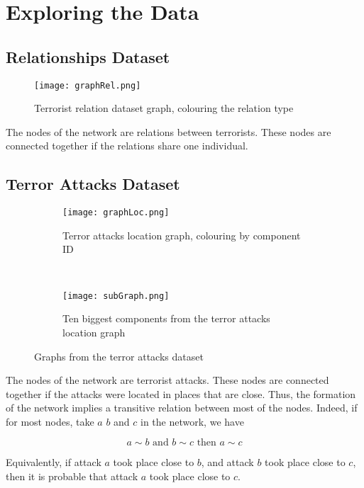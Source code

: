 \section{Exploring the Data}
\label{sec:Exploring the Data}

\subsection{Relationships Dataset}
\label{subsec:Relationships Dataset}

\begin{figure}[H]
\begin{center}

        \texttt{[image: graphRel.png]}
        \label{fig:graphLoc}
        \caption{Terrorist relation dataset graph, colouring the relation type}
        
\end{center}
\end{figure}

The nodes of the network are relations between terrorists. These nodes are connected together if the relations share one individual.

\subsection{Terror Attacks Dataset}
\label{subsec:Terror Attacks Dataset}

\begin{figure}[H]
\begin{center}
    \begin{subfigure}[b]{0.45\textwidth}
        \texttt{[image: graphLoc.png]}
        \caption{Terror attacks location graph, colouring by component ID}
        \label{fig:graphLoc}
    \end{subfigure}
    ~
    \begin{subfigure}[b]{0.45\textwidth}
        \texttt{[image: subGraph.png]}
        \caption{Ten biggest components from the terror attacks location graph}
        \label{fig:subGraph}
    \end{subfigure}
\caption{Graphs from the terror attacks dataset}
\label{fig:graphPlots}
\end{center}
\end{figure}

The nodes of the network are terrorist attacks. These nodes are connected together if the attacks were located in places that are close.
Thus, the formation of the network implies a transitive relation between most of the nodes. Indeed, if for most nodes, take $a$ $b$ and $c$ in the network, we have

\begin{equation}
	a \sim b \text{ and } b \sim c \text{ then } a \sim c 
\end{equation}

Equivalently, if attack $a$ took place close to $b$, and attack $b$ took place close to $c$, then it is probable that attack $a$ took place close to $c$.

